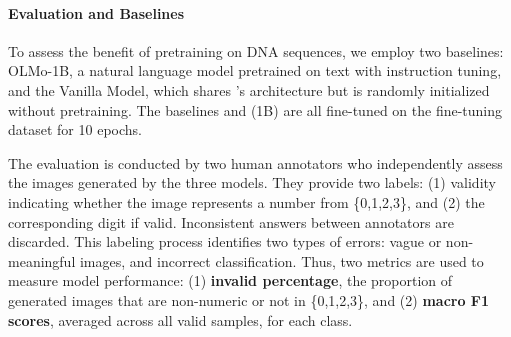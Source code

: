 
\paragraph{Evaluation and Baselines} To assess the benefit of pretraining on DNA sequences, we employ two baselines: OLMo-1B, a natural language model pretrained on text with instruction tuning, and the Vanilla Model, which shares \method's architecture but is randomly initialized without pretraining. The baselines and \method (1B) are all fine-tuned on the fine-tuning dataset for 10 epochs.

The evaluation is conducted by two human annotators who independently assess the images generated by the three models. They provide two labels: (1) validity indicating whether the image represents a number from 
\{0,1,2,3\}, and (2) the corresponding digit if valid. 
Inconsistent answers between annotators are discarded. This labeling process identifies two types of errors: vague or non-meaningful images, and incorrect classification. Thus, two metrics are used to measure model performance: (1) \textbf{invalid percentage}, the proportion of generated images that are non-numeric or not in \{0,1,2,3\}, and (2) \textbf{macro F1 scores}, averaged across all valid samples, for each class.



